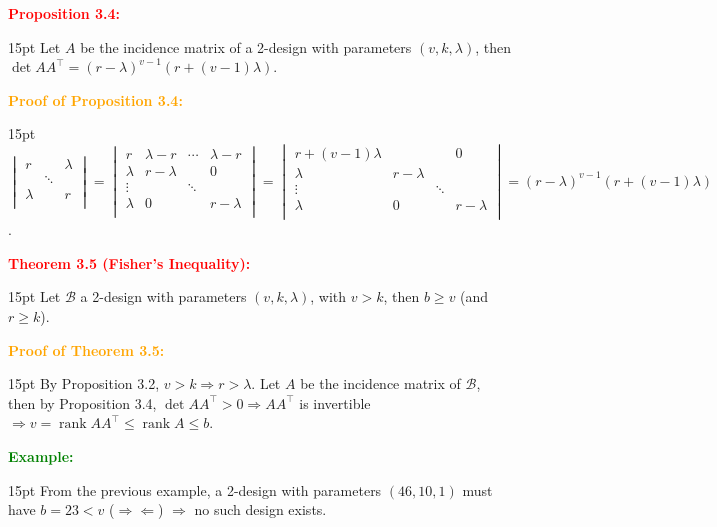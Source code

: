 \documentclass[12pt]{article}
\newcommand{\noparskip}{\vspace{-\parskip}}
\newenvironment{dent}
	{\begin{adjustwidth}{15pt}{}\noparskip}
	{\end{adjustwidth}}
\newenvironment{result}[1]
	{\textcolor{Red}{\textbf{#1:}}\begin{dent}}
	{\end{dent}}
\newenvironment{proof}[1]
	{\textcolor{Orange}{\textbf{Proof of #1:}}\begin{dent}}
	{\end{dent}}
\newenvironment{example}
	{\textcolor{Green}{\textbf{Example:}}\begin{dent}}
	{\end{dent}}
\renewcommand{\implies}{\Rightarrow}
\newcommand{\contradiction}{\Rightarrow \Leftarrow}
\newcommand{\cB}{\mathcal{B}}
\newcommand{\rank}{\operatorname{rank}}
\begin{document}
\begin{result}{Proposition 3.4}
Let $A$ be the incidence matrix of a 2-design with parameters $(v, k, \lambda)$, then $\det{AA^\top} = (r - \lambda)^{v - 1} (r + (v - 1) \lambda)$.
\end{result}

\begin{proof}{Proposition 3.4}
$\begin{vmatrix}
          r &           & \lambda \\
            & \ddots &              \\
\lambda &          &            r \\
\end{vmatrix} = \begin{vmatrix}
           r & \lambda - r & \cdots & \lambda - r \\
\lambda & r - \lambda &           &               0 \\
   \vdots &                  & \ddots &                  \\
\lambda &               0 &           & r - \lambda \\
\end{vmatrix} = \begin{vmatrix}
r + (v - 1) \lambda &                  &           &               0 \\
               \lambda & r - \lambda &           &                  \\
                  \vdots &                  & \ddots &                  \\
               \lambda &               0 &           & r - \lambda \\
\end{vmatrix} = (r - \lambda)^{v - 1} (r + (v - 1) \lambda)$.
\end{proof}

\begin{result}{Theorem 3.5 (Fisher's Inequality)}
Let $\cB$ a 2-design with parameters $(v, k, \lambda)$, with $v > k$, then $b \ge v$ (and $r \ge k$).
\end{result}

\begin{proof}{Theorem 3.5}
By Proposition 3.2, $v > k \implies r > \lambda$. Let $A$ be the incidence matrix of $\cB$, then by Proposition 3.4, $\det{AA^\top} > 0 \implies AA^\top$ is invertible $\implies v = \rank AA^\top \le \rank A \le b$.
\end{proof}

\begin{example}
From the previous example, a 2-design with parameters $(46, 10, 1)$ must have $b = 23 < v$ ($\contradiction$) $\implies$ no such design exists.
\end{example}
\end{document}
